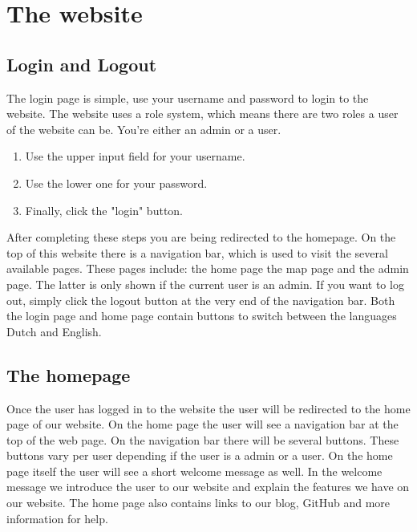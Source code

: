 \documentclass[a4paper]{article}
\begin{document}
\newpage
\section{The website}
\subsection{Login and Logout}
The login page is simple, use your username and password to login to the website. The website uses a role system, which means there are two roles a user of the website can be. You're either an admin or a user. 

\begin{enumerate}[]
	\item Use the upper input field for your username.
	\item Use the lower one for your password.
	\item Finally, click the "login" button.
\end{enumerate}
\noindent
After completing these steps you are being redirected to the homepage.
\newline
\newline
On the top of this website there is a navigation bar, which is used to visit the several available pages. These pages include: the home page the map page and the admin page. The latter is only shown if the current user is an admin.
\newline
\newline
If you want to log out, simply click the logout button at the very end of the navigation bar.
\newline
\newline
Both the login page and home page contain buttons to switch between the languages Dutch and English.

\subsection{The homepage}
Once the user has logged in to the website the user will be redirected to the home page of our website. On the home page the user will see a navigation bar at the top of the web page. On the navigation bar there will be several buttons. These buttons vary per user depending if the user is a admin or a user. 
\newline
\newline
On the home page itself the user will see a short welcome message as well. In the welcome message we introduce the user to our website and explain the features we have on our website. The home page also contains links to our blog, GitHub and more information for help.
\pagebreak
\end{document}
